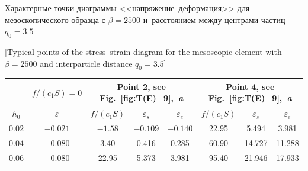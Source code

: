 \begin{table}[tbh!]

\centering \small

{Характерные точки диаграммы <<напряжение--деформация>> для мезоскопического образца с $\beta=2500$ и~расстоянием между центрами частиц $q_0=3.5$ }



[Typical points of the stress--strain diagram for the mesoscopic element with $\beta=2500$ and interparticle distance $q_0=3.5$]




\renewcommand{\tabcolsep}{0.28cm}

\begin{tabular}{c|c|c|c|c|c|c|c}

\hline    

		& \footnotesize $f/(c_1S)=0$	&\multicolumn{3}{c|}{ \footnotesize Point 2, see Fig.~\ref{fig:T(E)_9},~{\sl a}}				

		&\multicolumn{3}{c}{\footnotesize Point 4, see Fig.~\ref{fig:T(E)_9},~{\sl a}} 				\\ \hline                                       

\footnotesize $h_0$		& \footnotesize $\varepsilon$	&\footnotesize $f/(c_1S)$	&\footnotesize $\varepsilon_s$	&\footnotesize $\varepsilon_e$	&\footnotesize $f/(c_1S)$	& \footnotesize $\varepsilon_s$	& \footnotesize$\varepsilon_e$	\\ \hline

\rule{0mm}{12pt}%

$0.02$	& $-0.021$		& $-1.58$	& $-0.109$		& $-0.140$ 		&22.95	&\phantom{$1$}5.494 		&\phantom{$1$}3.981		\\ 

$0.04$	& $-0.080$		& \phantom{$-$}3.40		&\phantom{$-$}0.416		&\phantom{$-$}0.285		&60.90	&14.727 		&11.288		\\ 

$0.06$	& $-0.080$		& \phantom{$1$}22.95	&\phantom{$-$}5.373		&\phantom{$-$}3.981		&95.40	&21.946 		&17.933		\\ \hline

\end{tabular}

\end{table}








